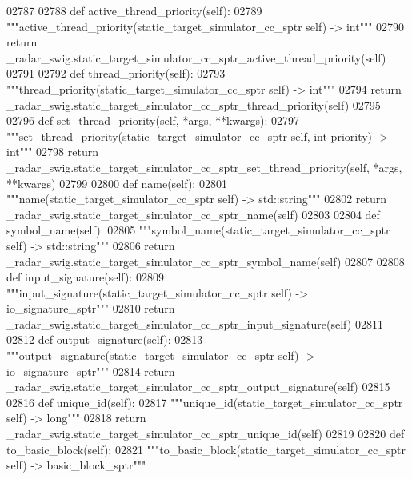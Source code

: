 \begin{DoxyCode}
{{{{{{{{{{02787 
02788     \textcolor{keyword}{def }active_thread_priority(self):
02789         \textcolor{stringliteral}{"""active\_thread\_priority(static\_target\_simulator\_cc\_sptr self) -> int"""}
02790         \textcolor{keywordflow}{return} \_radar\_swig.static\_target\_simulator\_cc\_sptr\_active\_thread\_priority(self)
02791 
02792     \textcolor{keyword}{def }thread_priority(self):
02793         \textcolor{stringliteral}{"""thread\_priority(static\_target\_simulator\_cc\_sptr self) -> int"""}
02794         \textcolor{keywordflow}{return} \_radar\_swig.static\_target\_simulator\_cc\_sptr\_thread\_priority(self)
02795 
02796     \textcolor{keyword}{def }set_thread_priority(self, *args, **kwargs):
02797         \textcolor{stringliteral}{"""set\_thread\_priority(static\_target\_simulator\_cc\_sptr self, int priority) -> int"""}
02798         \textcolor{keywordflow}{return} \_radar\_swig.static\_target\_simulator\_cc\_sptr\_set\_thread\_priority(self, *args, **kwargs)
02799 
02800     \textcolor{keyword}{def }name(self):
02801         \textcolor{stringliteral}{"""name(static\_target\_simulator\_cc\_sptr self) -> std::string"""}
02802         \textcolor{keywordflow}{return} \_radar\_swig.static\_target\_simulator\_cc\_sptr\_name(self)
02803 
02804     \textcolor{keyword}{def }symbol_name(self):
02805         \textcolor{stringliteral}{"""symbol\_name(static\_target\_simulator\_cc\_sptr self) -> std::string"""}
02806         \textcolor{keywordflow}{return} \_radar\_swig.static\_target\_simulator\_cc\_sptr\_symbol\_name(self)
02807 
02808     \textcolor{keyword}{def }input_signature(self):
02809         \textcolor{stringliteral}{"""input\_signature(static\_target\_simulator\_cc\_sptr self) -> io\_signature\_sptr"""}
02810         \textcolor{keywordflow}{return} \_radar\_swig.static\_target\_simulator\_cc\_sptr\_input\_signature(self)
02811 
02812     \textcolor{keyword}{def }output_signature(self):
02813         \textcolor{stringliteral}{"""output\_signature(static\_target\_simulator\_cc\_sptr self) -> io\_signature\_sptr"""}
02814         \textcolor{keywordflow}{return} \_radar\_swig.static\_target\_simulator\_cc\_sptr\_output\_signature(self)
02815 
02816     \textcolor{keyword}{def }unique_id(self):
02817         \textcolor{stringliteral}{"""unique\_id(static\_target\_simulator\_cc\_sptr self) -> long"""}
02818         \textcolor{keywordflow}{return} \_radar\_swig.static\_target\_simulator\_cc\_sptr\_unique\_id(self)
02819 
02820     \textcolor{keyword}{def }to_basic_block(self):
02821         \textcolor{stringliteral}{"""to\_basic\_block(static\_target\_simulator\_cc\_sptr self) -> basic\_block\_sptr"""}
}}}}}}}}}}
\end{DoxyCode}
